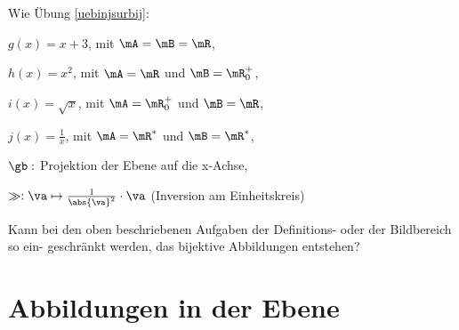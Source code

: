 \documentclass[%
11pt,%
twoside,%
titlepage,%
german,%
headsepline%
]{scrartcl}
\begin{document}
\pagebreak

\begin{ueb}
Wie Übung \ref{uebinjsurbij}:

\begin{enumeratea}
\addtocounter{enumi}{2}
\item $g(x)=x+3$, mit $\mA=\mB=\mR$,
\item $h(x)=x^2$, mit $\mA=\mR$ und $\mB=\mR^+_0$,
\item $i(x)=\sqrt{x}$, mit $\mA=\mR^+_0$ und $\mB=\mR$,
\item $j(x)=\frac{1}{x}$, mit $\mA=\mR^*$ und $\mB=\mR^*$,
\item $\gb:$ Projektion der Ebene auf die x-Achse,
\item $\gg:\va\mapsto\frac{1}{\abs{\va}^2}\cdot\va$ (Inversion am Einheitskreis)
\end{enumeratea}
\end{ueb}

\begin{ueb}
Kann bei den oben beschriebenen Aufgaben der Definitions- oder der Bildbereich so ein- geschränkt werden, das bijektive Abbildungen entstehen?
\end{ueb}

\section{Abbildungen in der Ebene}
\end{document}
